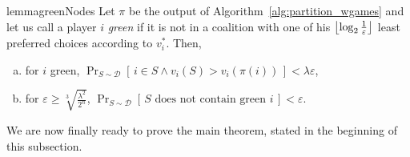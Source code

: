 \documentclass[letterpaper]{article} %
\newtheorem{theorem}{Theorem}[section]
\DeclarePairedDelimiter{\floor}{\lfloor}{\rfloor}
\let\eps\varepsilon
\newcommand{\distribution}{\mathcal{D}}
\newcommand{\Prob}[2]{\Pr_{#2}\left[\,#1\,\right]}
\newcommand{\Wthreshold}{\ensuremath{\floor*{\log_2{\frac{1}{\varepsilon}}}}}
\newcommand{\W}{\ensuremath{\mathcal{W}}}
\begin{document}
\begin{restatable}{lemma}{greenNodes}\label{lem:green_nodes}
Let $\pi$ be the output of Algorithm~\ref{alg:partition_wgames} and let us call a player $i$ \emph{green} if it is not in a coalition with one of his $\Wthreshold$ least preferred choices according to $v_i^*$. Then,
\begin{enumerate}[a)]
    \item for $i$ green, $\Prob{i \in S \land v_i(S)>v_i(\pi(i))}{S \sim \distribution} < \lambda\eps$,
    \item for $\eps \geq \sqrt[3]{\frac{\lambda^{2}}{2^{n}}}$, $\Prob{S \text{ does not contain green } i}{S \sim \distribution} < \eps$.
\end{enumerate}
\end{restatable}
We are now finally ready to prove the main theorem, stated in the beginning of this subsection.

\end{document}
